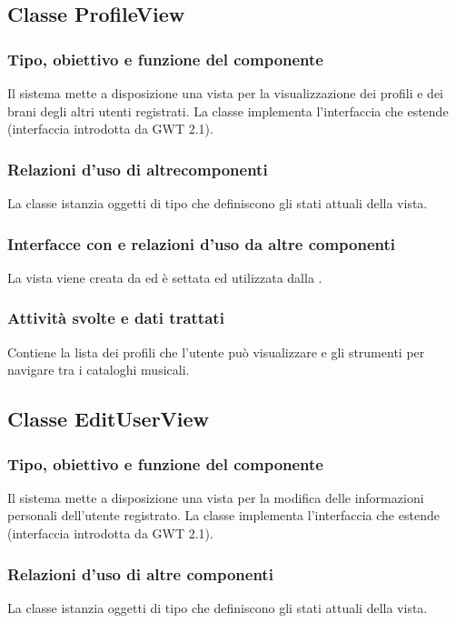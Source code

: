 \subsection{Classe ProfileView}
\subsubsection*{Tipo, obiettivo e funzione del componente}
Il sistema mette a disposizione una vista per la visualizzazione dei profili e
dei brani degli altri utenti registrati. La classe 
implementa l'interfaccia  che estende 
(interfaccia introdotta da GWT 2.1).
\subsubsection*{Relazioni d'uso di altrecomponenti} 
La classe istanzia oggetti di tipo  che definiscono gli stati
attuali della vista.
\subsubsection*{Interfacce con e relazioni d'uso da altre componenti}
 La vista viene creata da  ed \`e settata ed utilizzata dalla
 .
 \subsubsection*{Attivit\`a svolte e dati trattati}
Contiene la lista dei profili che l'utente pu\`o visualizzare e gli strumenti
per navigare tra i cataloghi musicali.

\subsection{Classe EditUserView}
\subsubsection*{Tipo, obiettivo e funzione del componente}
Il sistema mette a disposizione una vista per la
modifica delle informazioni personali dell'utente registrato. La classe
 implementa l'interfaccia  che estende
 (interfaccia introdotta da GWT 2.1).

\subsubsection*{Relazioni d'uso di altre componenti}
La classe istanzia oggetti di tipo  che definiscono gli stati
attuali della vista.
